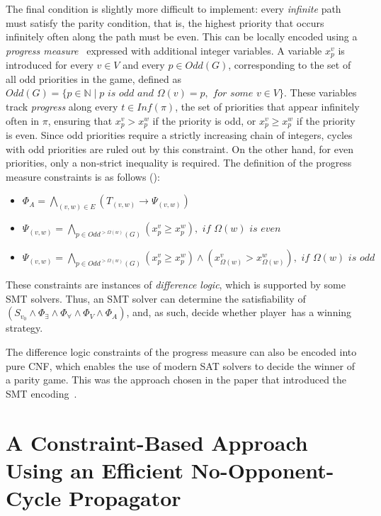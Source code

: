 \documentclass[runningheads]{llncs}
\begin{document}
The final condition is slightly more difficult to implement: every \textit{infinite} path must satisfy the parity condition, that is, the highest priority that occurs infinitely often along the path must be even. This can be locally encoded using a \textit{progress measure}~\cite{Heljanko:2012,Jurdziński:2000} expressed with additional integer variables. A variable $x_p^v$ is introduced for every $v \in V$ and every $p \in \textit{Odd}(G)$, corresponding to the set of all odd priorities in the game, defined as $\textit{Odd}(G) = \{ p\in {\mathbb N} \mid p \textit{ is odd and } \Omega(v) = p, \textit{ for some } v \in V \}$. These variables track \textit{progress} along every $ t \in \textit{Inf}(\pi) $, the set of priorities that appear infinitely often in $\pi$, ensuring that $x_p^v > x_p^w$ if the priority is odd, or $x_p^v \geq x_p^w$ if the priority is even. Since odd priorities require a strictly increasing chain of integers, cycles with odd priorities are ruled out by this constraint. On the other hand, for even priorities, only a non-strict inequality is required.
%
The definition of the progress measure constraints is as follows (\cite{Heljanko:2012,Cotton:2004}):

\begin{itemize}
\item $\Phi_A = \bigwedge_{(v,w) \in E} \left(T_{(v,w)} \rightarrow \Psi_{(v,w)}\right)$
\item $\Psi_{(v,w)} = \bigwedge_{p \in \textit{Odd}^{>\Omega(w)}(G)} (x_p^v \geqslant x_p^w), \textit{ if } \Omega(w) \textit{ is even}$
\item $\Psi_{(v,w)} = \bigwedge_{p \in \textit{Odd}^{>\Omega(w)}(G)} (x_p^v \geqslant x_p^w) \land 
(x_{\Omega(w)}^v > x_{\Omega(w)}^w), \textit{ if } \Omega(w) \textit{ is odd}$
\end{itemize}

These constraints are instances of {\em difference logic}, which is supported by some SMT solvers. Thus, an SMT solver can determine the satisfiability of~$(S_{v_0} \wedge \Phi_{\exists} \wedge \Phi_{\forall} \wedge \Phi_V \wedge \Phi_A)$, and, as such, decide whether player~\even has a winning strategy.

The difference logic constraints of the progress measure can also be encoded into pure CNF, which enables the use of modern SAT solvers to decide the winner of a parity game. This was the approach chosen in the paper that introduced the SMT encoding~\cite{Heljanko:2012}. 

\section{A Constraint-Based Approach Using an Efficient No-Opponent-Cycle Propagator}
\end{document}
